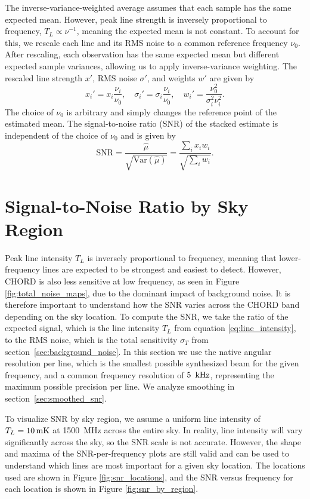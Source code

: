 The inverse-variance-weighted average assumes that each sample has the same expected mean. However, peak line strength is inversely proportional to frequency, \(T_L \propto \nu^{-1}\), meaning the expected mean is not constant. To account for this, we rescale each line and its RMS noise to a common reference frequency \(\nu_0\). After rescaling, each observation has the same expected mean but different expected sample variances, allowing us to apply inverse-variance weighting. The rescaled line strength \(x'\), RMS noise \(\sigma'\), and weights \(w'\) are given by
\begin{equation}
    x_i' = x_i \frac{\nu_i}{\nu_0}, \quad \sigma_i' = \sigma_i \frac{\nu_i}{\nu_0}, \quad w_i' = \frac{\nu_0^2}{\sigma_i^2 \nu_i^2}.
    \label{eq:rescaled_signal_and_noise}
\end{equation}
The choice of \(\nu_0\) is arbitrary and simply changes the reference point of the estimated mean. The signal-to-noise ratio (SNR) of the stacked estimate is independent of the choice of \(\nu_0\) and is given by
\begin{equation}
    \mathrm{SNR} = \frac{\hat{\mu}}{\sqrt{\mathrm{Var}(\hat{\mu})}} = \frac{\sum_i x_i w_i}{\sqrt{\sum_i w_i}}.
\end{equation}

\section{Signal-to-Noise Ratio by Sky Region}
\label{sec:snr_by_region}
Peak line intensity \(T_L\) is inversely proportional to frequency, meaning that lower-frequency lines are expected to be strongest and easiest to detect. However, CHORD is also less sensitive at low frequency, as seen in Figure \ref{fig:total_noise_maps}, due to the dominant impact of background noise. It is therefore important to understand how the SNR varies across the CHORD band depending on the sky location. To compute the SNR, we take the ratio of the expected signal, which is the line intensity \(T_L\) from equation \eqref{eq:line_intensity}, to the RMS noise, which is the total sensitivity \(\sigma_T\) from section~\ref{sec:background_noise}. In this section we use the native angular resolution per line, which is the smallest possible synthesized beam for the given frequency, and a common frequency resolution of \(5~\, \mathrm{kHz}\), representing the maximum possible precision per line. We analyze smoothing in section~\ref{sec:smoothed_snr}.

To visualize SNR by sky region, we assume a uniform line intensity of \(T_L = 10 \, \mathrm{mK}\) at 1500~MHz across the entire sky. In reality, line intensity will vary significantly across the sky, so the SNR scale is not accurate. However, the shape and maxima of the SNR-per-frequency plots are still valid and can be used to understand which lines are most important for a given sky location. The locations used are shown in Figure \ref{fig:snr_locations}, and the SNR versus frequency for each location is shown in Figure \ref{fig:snr_by_region}.\\

